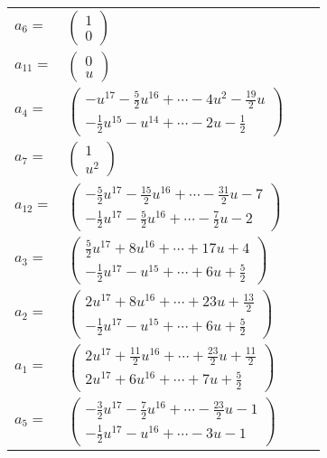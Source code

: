 \documentclass[1p]{elsarticle_modified}
\theoremstyle{definition}
\begin{document}
\begin{tabular}{m{7pt} m{180pt} m{7pt} m{180pt} }
\flushright $a_{6}=$&$\begin{pmatrix}1\\0\end{pmatrix}$ \\
\flushright $a_{11}=$&$\begin{pmatrix}0\\u\end{pmatrix}$ \\
\flushright $a_{4}=$&$\begin{pmatrix}- u^{17}-\frac{5}{2} u^{16}+\cdots-4 u^2-\frac{19}{2} u\\-\frac{1}{2} u^{15}- u^{14}+\cdots-2 u-\frac{1}{2}\end{pmatrix}$ \\
\flushright $a_{7}=$&$\begin{pmatrix}1\\u^2\end{pmatrix}$ \\
\flushright $a_{12}=$&$\begin{pmatrix}-\frac{5}{2} u^{17}-\frac{15}{2} u^{16}+\cdots-\frac{31}{2} u-7\\-\frac{1}{2} u^{17}-\frac{5}{2} u^{16}+\cdots-\frac{7}{2} u-2\end{pmatrix}$ \\
\flushright $a_{3}=$&$\begin{pmatrix}\frac{5}{2} u^{17}+8 u^{16}+\cdots+17 u+4\\-\frac{1}{2} u^{17}- u^{15}+\cdots+6 u+\frac{5}{2}\end{pmatrix}$ \\
\flushright $a_{2}=$&$\begin{pmatrix}2 u^{17}+8 u^{16}+\cdots+23 u+\frac{13}{2}\\-\frac{1}{2} u^{17}- u^{15}+\cdots+6 u+\frac{5}{2}\end{pmatrix}$ \\
\flushright $a_{1}=$&$\begin{pmatrix}2 u^{17}+\frac{11}{2} u^{16}+\cdots+\frac{23}{2} u+\frac{11}{2}\\2 u^{17}+6 u^{16}+\cdots+7 u+\frac{5}{2}\end{pmatrix}$ \\
\flushright $a_{5}=$&$\begin{pmatrix}-\frac{3}{2} u^{17}-\frac{7}{2} u^{16}+\cdots-\frac{23}{2} u-1\\-\frac{1}{2} u^{17}- u^{16}+\cdots-3 u-1\end{pmatrix}$ \\

\end{tabular}
\end{document}
